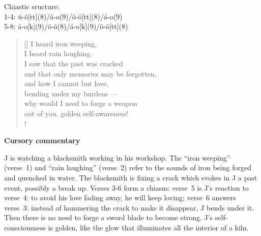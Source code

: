 \documentclass[a4paper,12pt,twoside,final]{book}
\begin{document}
\noindent Chiastic sructure: \\
1-4: ü-ö[tt](8)/á-o(9)/ö-ö[tt](8)/á-o(9) \\
5-8: á-o[k](9)/ö-ö(8)/á-o[k](9)/ö-ö[tt](8)

\newpage


\settowidth{\versewidth}{and that only a memory can be forgotten;}

\begin{verse}[\versewidth]
  I heard iron weeping, \\
  I heard rain laughing. \\
  I saw that the past was cracked \\
  and that only memories may be forgotten, \\
  and how I cannot but love, \\
  bending under my burdens --- \\
  why would I need to forge a weapon \\
  out of you, golden self-awareness! \\!
\end{verse}


\bigskip

\noindent \textbf{Cursory commentary}

\medskip

J is watching a blacksmith working in his workshop. The ``iron
weeping'' (verse~1) and ``rain laughing'' (verse~2) refer to the
sounds of iron being forged and quenched in water. The blacksmith is
fixing a crack which evokes in J a past event, possibly a break
up. Verses 3-6 form a chiasm: verse~5 is J's reaction to verse~4: to
avoid his love fading away, he will keep loving; verse~6 answers
verse~3: instead of hammering the crack to make it disappear, J bends
under it. Then there is no need to forge a sword blade to become
strong. J's self-consciousness is golden, like the glow that
illuminates all the interior of a kiln.

\newpage

\settowidth{\versewidth}{}
\end{document}
